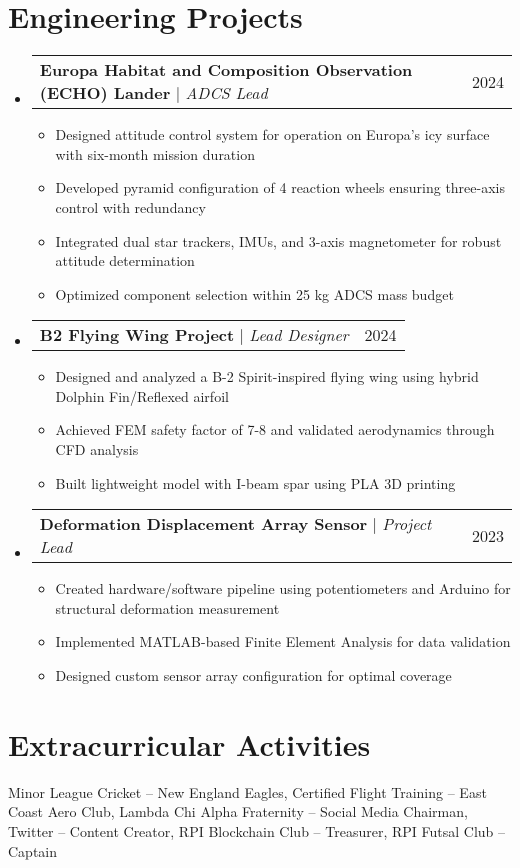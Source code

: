 \documentclass[letterpaper,11pt]{article}
\makeatletter
\newcommand{\resumeItem}[1]{
  \item\small{
    {#1 \vspace{-2pt}}
  }
}
\newcommand{\resumeProjectHeading}[2]{
    \item
    \begin{tabular*}{0.97\textwidth}{l@{\extracolsep{\fill}}r}
      \small#1 & #2 \\
    \end{tabular*}\vspace{-7pt}
}
\newcommand{\resumeSubHeadingListStart}{\begin{itemize}[leftmargin=0.15in, label={}]}
\newcommand{\resumeSubHeadingListEnd}{\end{itemize}}
\newcommand{\resumeItemListStart}{\begin{itemize}}
\newcommand{\resumeItemListEnd}{\end{itemize}\vspace{-5pt}}
\makeatother
\begin{document}
\section{Engineering Projects}
\resumeSubHeadingListStart

\resumeProjectHeading
{\textbf{Europa Habitat and Composition Observation (ECHO) Lander} $|$ \emph{ADCS Lead}}{2024}
\resumeItemListStart
\resumeItem{Designed attitude control system for operation on Europa's icy surface with six-month mission duration}
\resumeItem{Developed pyramid configuration of 4 reaction wheels ensuring three-axis control with redundancy}
\resumeItem{Integrated dual star trackers, IMUs, and 3-axis magnetometer for robust attitude determination}
\resumeItem{Optimized component selection within 25 kg ADCS mass budget}
\resumeItemListEnd

\resumeProjectHeading
{\textbf{B2 Flying Wing Project} $|$ \emph{Lead Designer}}{2024}
\resumeItemListStart
\resumeItem{Designed and analyzed a B-2 Spirit-inspired flying wing using hybrid Dolphin Fin/Reflexed airfoil}
\resumeItem{Achieved FEM safety factor of 7-8 and validated aerodynamics through CFD analysis}
\resumeItem{Built lightweight model with I-beam spar using PLA 3D printing}
\resumeItemListEnd

\resumeProjectHeading
{\textbf{Deformation Displacement Array Sensor} $|$ \emph{Project Lead}}{2023}
\resumeItemListStart
\resumeItem{Created hardware/software pipeline using potentiometers and Arduino for structural deformation measurement}
\resumeItem{Implemented MATLAB-based Finite Element Analysis for data validation}
\resumeItem{Designed custom sensor array configuration for optimal coverage}
\resumeItemListEnd

\resumeSubHeadingListEnd

\section{Extracurricular Activities}
Minor League Cricket -- New England Eagles, Certified Flight Training -- East Coast Aero Club, Lambda Chi Alpha Fraternity -- Social Media Chairman, Twitter -- Content Creator, RPI Blockchain Club -- Treasurer, RPI Futsal Club -- Captain
\end{document}
